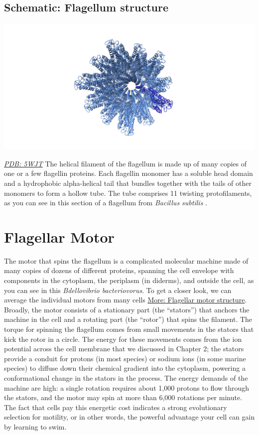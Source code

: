 \documentclass[]{tufte-book}
\begin{document}
\hypertarget{Flagellum_structure}{%
\subsection*{Schematic: Flagellum structure}\label{Flagellum_structure}}

\includegraphics{img/schematics/6_1_1}

\href{http://rcsb.org/structure/5WJT}{\emph{PDB: 5WJT}}
The helical filament of the flagellum is made up of many copies of one or a few flagellin proteins. Each flagellin monomer has a soluble head domain and a hydrophobic alpha-helical tail that bundles together with the tails of other monomers to form a hollow tube. The tube comprises 11 twisting protofilaments, as you can see in this section of a flagellum from \emph{Bacillus subtilis} \citep{wang2017}.

\hypertarget{flagellar-motor}{%
\section{Flagellar Motor}\label{flagellar-motor}}

The motor that spins the flagellum is a complicated molecular machine made of many copies of dozens of different proteins, spanning the cell envelope with components in the cytoplasm, the periplasm (in diderms), and outside the cell, as you can see in this \emph{Bdellovibrio bacteriovorus}. To get a closer look, we can average the individual motors from many cells \protect\hyperlink{Flagellar_motor_structure}{More: Flagellar motor structure}. Broadly, the motor consists of a stationary part (the ``stators'') that anchors the machine in the cell and a rotating part (the ``rotor'') that spins the filament. The torque for spinning the flagellum comes from small movements in the stators that kick the rotor in a circle. The energy for these movements comes from the ion potential across the cell membrane that we discussed in Chapter 2; the stators provide a conduit for protons (in most species) or sodium ions (in some marine species) to diffuse down their chemical gradient into the cytoplasm, powering a conformational change in the stators in the process. The energy demands of the machine are high: a single rotation requires about 1,000 protons to flow through the stators, and the motor may spin at more than 6,000 rotations per minute. The fact that cells pay this energetic cost indicates a strong evolutionary selection for motility, or in other words, the powerful advantage your cell can gain by learning to swim.
\end{document}
